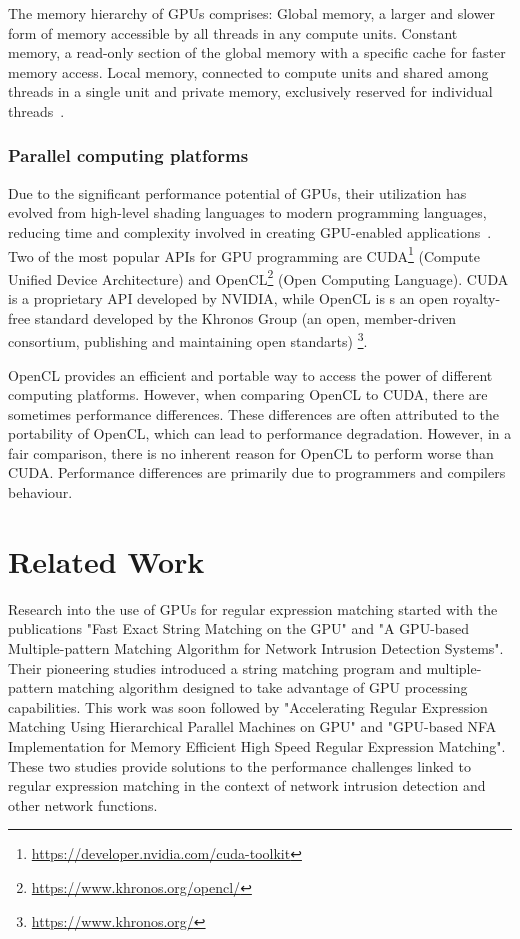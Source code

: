 \documentclass[10pt,onecolumn,twoside,english,a4paper]{article}
\begin{document}
The memory hierarchy of GPUs comprises: Global memory, a larger and slower form of memory accessible by all threads in any compute units. Constant memory, a read-only section of the global memory with a specific cache for faster memory access. Local memory, connected to compute units and shared among threads in a single unit and private memory, exclusively reserved for individual threads~\cite{yaneva2022gpuaccelerationFSA}.

\subsubsection{Parallel computing platforms} \label{Parallel computing platforms}
Due to the significant performance potential of GPUs, their  utilization has evolved from high-level shading languages to modern programming languages, reducing time and complexity involved in creating GPU-enabled applications~\cite{Asaduzzaman:Impact_CUDA_OpenCL}.
Two of the most popular APIs for GPU programming are CUDA\footnote{\url{https://developer.nvidia.com/cuda-toolkit}} (Compute Unified Device Architecture) and OpenCL\footnote{\url{https://www.khronos.org/opencl/}} (Open Computing Language). CUDA is a proprietary API developed by NVIDIA, while OpenCL is s an open royalty-free standard developed by the Khronos Group (an open, member-driven consortium, publishing and maintaining open standarts) \footnote{\url{https://www.khronos.org/}}.

OpenCL provides an efficient and portable way to access the power of different computing platforms. However, when comparing OpenCL to CUDA, there are sometimes performance differences. These differences are often attributed to the portability of OpenCL, which can lead to performance degradation. However, in a fair comparison, there is no inherent reason for OpenCL to perform worse than CUDA. Performance differences are primarily due to programmers and compilers behaviour\cite{Fang:Comparison-cuda-opencl}.

\section{Related Work} \label{Related work}
Research into the use of GPUs for regular expression matching started with the publications "Fast Exact String Matching on the GPU"\cite{schatz2007fast} and "A GPU-based Multiple-pattern Matching Algorithm for Network Intrusion
Detection Systems"\cite{huang2008gpu}. Their pioneering studies introduced a string matching program and multiple-pattern matching algorithm designed to take advantage of GPU processing capabilities.
This work was soon followed by "Accelerating Regular Expression Matching Using Hierarchical Parallel Machines on GPU"\cite{Lin:regex_gpu_parallel} and "GPU-based NFA Implementation for Memory Efficient High Speed Regular Expression Matching"\cite{Zu:GPU-NFA}. These two studies provide solutions to the performance challenges linked to regular expression matching in the context of network intrusion detection and other network functions.
\end{document}
